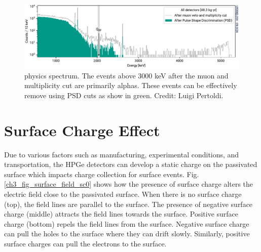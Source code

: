   \begin{figure}[!htb]
\centering
  \includegraphics[width=0.99\linewidth]{ch2/figs/l200-phy-spectrum-psd.pdf}
  \caption{{\Ltwo} physics spectrum. The events above 3000 keV after the muon and multiplicity cut are primarily alphas. These events can be effectively remove using PSD cuts as show in green. Credit: Luigi Pertoldi.}
\label{ch3_fig_L200_surface_background}
  \end{figure}

\section{Surface Charge Effect}
Due to various factors such as manufacturing, experimental conditions, and transportation, the HPGe detectors can develop a static charge on the passivated surface which impacts charge collection for surface events. Fig. \ref{ch3_fig_surface_field_sc0} shows how the presence of surface charge alters the electric field close to the passivated surface. When there is no surface charge (top), the field lines are parallel to the surface. The presence of negative surface charge (middle) attracts the field lines towards the surface. Positive surface charge (bottom) repels the field lines from the surface. Negative surface charge can pull the holes to the surface where they can drift slowly. Similarly, positive surface charges can pull the electrons to the surface.

